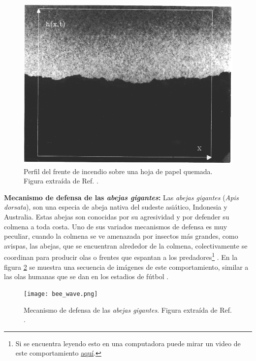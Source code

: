 \newpage
\begin{figure}[t]
    \centering
    \includegraphics[width=\imsize]{paper_burned.png}
    \caption[Perfil del frente de incendio sobre una hoja de papel quemada.]{Perfil del frente de incendio sobre una hoja de papel quemada. Figura extraída de Ref. \cite{zhang1992modeling}.}
    \label{fig:incendio}
\end{figure}


\textbf{Mecanismo de defensa de las \textit{abejas gigantes}:} Las \textit{abejas gigantes} (\textit{Apis dorsata}), son una especia de abeja nativa del sudeste asiático, 
Indonesia y Australia. Estas abejas son conocidas por su agresividad y por defender su colmena a toda costa. Uno de sus variados mecanismos de defensa es muy peculiar,
cuando la colmena se ve amenazada por insectos más grandes, como avispas, las abejas, que se encuentran alrededor de la colmena, colectivamente se coordinan para 
producir olas o frentes que espantan a los predadores\footnote{Si se encuentra leyendo esto en una computadora puede mirar un video de este comportamiento 
\href{https://youtu.be/8bNKU8GRYmU}{aquí}.} \cite{kastberger2014speeding,kastberger2013social,kastberger2008social}. En la figura \ref{fig:abeja} se muestra una secuencia de imágenes de este comportamiento, similar a las olas humanas que se dan en los estadios de fútbol \cite{farkas2002mexican,farkas2003human}.

\begin{figure}[b]
    \centering
    \texttt{[image: bee\_wave.png]}
    \caption[Mecanismo de defensa de las \textit{abejas gigantes}.]{Mecanismo de defensa de las \textit{abejas gigantes}. Figura extraída de Ref. \cite{youtube}.}
    \label{fig:abeja}
\end{figure}
\newpage

